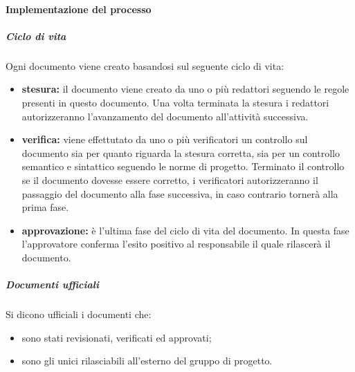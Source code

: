 			\paragraph{Implementazione del processo}
				\subparagraph{Ciclo di vita}
					Ogni documento viene creato basandosi sul seguente ciclo di vita:
					\begin{itemize}
					\item \textbf{stesura:} il documento viene creato da uno o più redattori seguendo le regole presenti in questo documento. Una volta terminata la stesura i redattori autorizzeranno l'avanzamento del documento all'attività successiva.
					\item \textbf{verifica:} viene effettutato da uno o più verificatori un controllo sul documento sia per quanto riguarda la stesura corretta, sia per un controllo semantico e sintattico seguendo le norme di progetto. Terminato il controllo se il documento dovesse essere corretto, i verificatori autorizzeranno il passaggio del documento alla fase successiva, in caso contrario tornerà alla prima fase.
					\item \textbf{approvazione:} è l'ultima fase del ciclo di vita del documento. In questa fase l'approvatore conferma l'esito positivo al responsabile il quale rilascerà il documento. 
					\end{itemize}
				\subparagraph{Documenti ufficiali}
					Si dicono ufficiali i documenti che:
					\begin{itemize}
						\item sono stati revisionati, verificati ed approvati;
						\item sono gli unici rilasciabili all'esterno del gruppo di progetto.
					\end{itemize}
					
